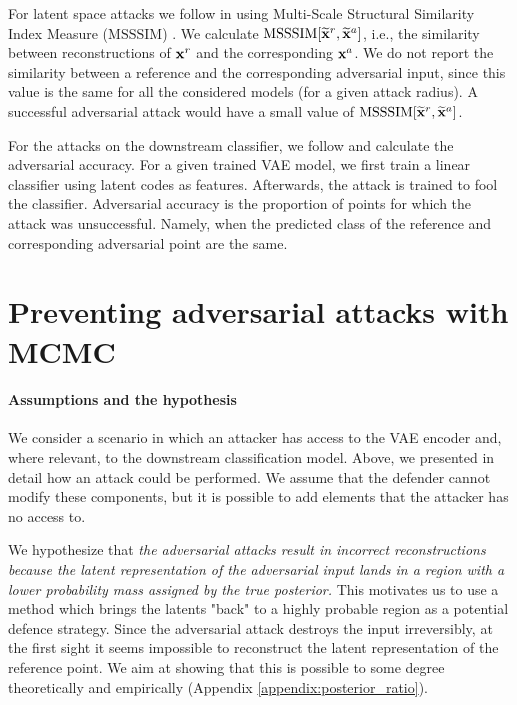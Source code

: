 For latent space attacks we follow \cite{kuzina2021adv} in using Multi-Scale Structural Similarity Index Measure ($\mathrm{MSSSIM}$) \cite{wang2003multiscale}. We calculate $\mathrm{MSSSIM}[\widetilde{{\mathbf{x}}}^{r}, \widetilde{{\mathbf{x}}}^{a}]$, i.e., the similarity between reconstructions of ${\mathbf{x}}^{r}$ and the corresponding ${\mathbf{x}}^{a}$. We do not report the similarity between a reference and the corresponding adversarial input, since this value is the same for all the considered models (for a given attack radius). A successful adversarial attack would have a small value of  $\mathrm{MSSSIM}[\widetilde{{\mathbf{x}}}^{r}, \widetilde{{\mathbf{x}}}^{a}]$. 

For the attacks on the downstream classifier, we follow \cite{cemgil2020autoencoding, Cemgil2019-vn} and calculate the adversarial accuracy. For a given trained VAE model, we first train a linear classifier using latent codes as features. Afterwards, the attack is trained to fool the classifier. Adversarial accuracy is the proportion of points for which the attack was unsuccessful. Namely, when the predicted class of the reference and corresponding adversarial point are the same.  

\section{Preventing adversarial attacks with MCMC} \label{sec:defence}

\paragraph{Assumptions and the hypothesis}

We consider a scenario in which an attacker has access to the VAE encoder and, where relevant, to the downstream classification model. Above, we presented in detail how an attack could be performed. We assume that the defender cannot modify these components, but it is possible to add elements that the attacker has no access to. 

We hypothesize that \textit{the adversarial attacks result in incorrect reconstructions because the latent representation of the adversarial input lands in a region with a lower probability mass assigned by the true posterior. %
}
This motivates us to use a method which brings the latents "back" to a highly probable region as a potential defence strategy. 
Since the adversarial attack destroys the input irreversibly, at the first sight it seems impossible to reconstruct the latent representation of the reference point. 
We aim at showing that this is possible to some degree theoretically and empirically (Appendix \ref{appendix:posterior_ratio}). 

